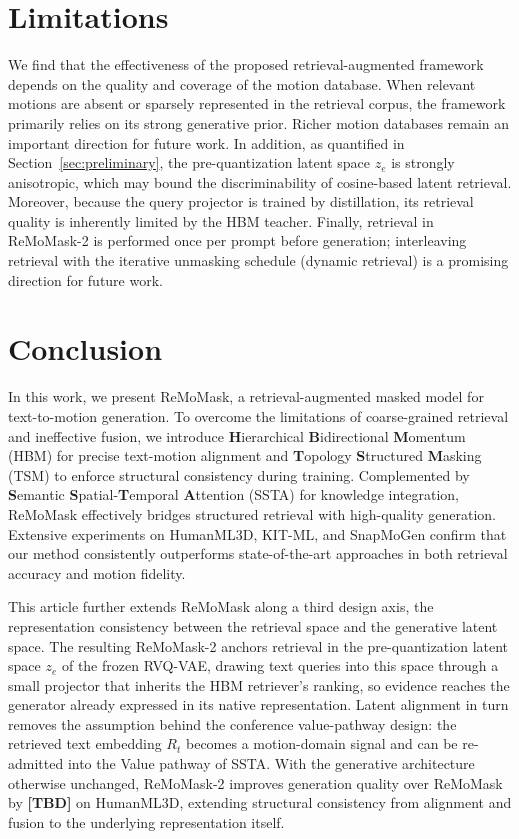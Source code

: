 \documentclass[10pt,journal,compsoc]{IEEEtran}
\begin{document}
\section{Limitations}
\label{sec:limitations}
We find that the effectiveness of the proposed retrieval-augmented framework depends on the quality and coverage of the motion database. 
When relevant motions are absent or sparsely represented in the retrieval corpus, the framework primarily relies on its strong generative prior.
Richer motion databases remain an important direction for future work.
In addition, as quantified in Section~\ref{sec:preliminary}, the pre-quantization latent space $z_e$ is strongly anisotropic, which may bound the discriminability of cosine-based latent retrieval. Moreover, because the query projector is trained by distillation, its retrieval quality is inherently limited by the HBM teacher. Finally, retrieval in ReMoMask-2 is performed once per prompt before generation; interleaving retrieval with the iterative unmasking schedule (dynamic retrieval) is a promising direction for future work.


\section{Conclusion}
\label{sec:conclusion}

In this work, we present ReMoMask, a retrieval-augmented masked model for text-to-motion generation. To overcome the limitations of coarse-grained retrieval and ineffective fusion, we introduce \textbf{H}ierarchical \textbf{B}idirectional \textbf{M}omentum (HBM) for precise text-motion alignment and \textbf{T}opology \textbf{S}tructured \textbf{M}asking (TSM) to enforce structural consistency during training. Complemented by \textbf{S}emantic \textbf{S}patial-\textbf{T}emporal \textbf{A}ttention (SSTA) for knowledge integration, ReMoMask effectively bridges structured retrieval with high-quality generation. Extensive experiments on HumanML3D, KIT-ML, and SnapMoGen confirm that our method consistently outperforms state-of-the-art approaches in both retrieval accuracy and motion fidelity.

This article further extends ReMoMask along a third design axis, the representation consistency between the retrieval space and the generative latent space. The resulting ReMoMask-2 anchors retrieval in the pre-quantization latent space $z_e$ of the frozen RVQ-VAE, drawing text queries into this space through a small projector that inherits the HBM retriever's ranking, so evidence reaches the generator already expressed in its native representation. Latent alignment in turn removes the assumption behind the conference value-pathway design: the retrieved text embedding $R_t$ becomes a motion-domain signal and can be re-admitted into the Value pathway of SSTA. With the generative architecture otherwise unchanged, ReMoMask-2 improves generation quality over ReMoMask by \textbf{[TBD]} on HumanML3D, extending structural consistency from alignment and fusion to the underlying representation itself.
\end{document}
